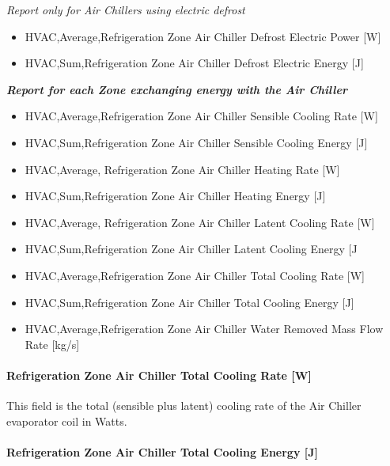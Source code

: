 \emph{Report only for Air Chillers using electric defrost}

\begin{itemize}
\item
  HVAC,Average,Refrigeration Zone Air Chiller Defrost Electric Power {[}W{]}
\item
  HVAC,Sum,Refrigeration Zone Air Chiller Defrost Electric Energy {[}J{]}
\end{itemize}

\textbf{\emph{Report for each Zone exchanging energy with the Air Chiller}}

\begin{itemize}
\item
  HVAC,Average,Refrigeration Zone Air Chiller Sensible Cooling Rate {[}W{]}
\item
  HVAC,Sum,Refrigeration Zone Air Chiller Sensible Cooling Energy {[}J{]}
\item
  HVAC,Average, Refrigeration Zone Air Chiller Heating Rate {[}W{]}
\item
  HVAC,Sum,Refrigeration Zone Air Chiller Heating Energy {[}J{]}
\item
  HVAC,Average, Refrigeration Zone Air Chiller Latent Cooling Rate {[}W{]}
\item
  HVAC,Sum,Refrigeration Zone Air Chiller Latent Cooling Energy {[}J
\item
  HVAC,Average,Refrigeration Zone Air Chiller Total Cooling Rate {[}W{]}
\item
  HVAC,Sum,Refrigeration Zone Air Chiller Total Cooling Energy {[}J{]}
\item
  HVAC,Average,Refrigeration Zone Air Chiller Water Removed Mass Flow Rate {[}kg/s{]}
\end{itemize}

\paragraph{Refrigeration Zone Air Chiller Total Cooling Rate {[}W{]}}\label{refrigeration-zone-air-chiller-total-cooling-rate-w-1}

This field is the total (sensible plus latent) cooling rate of the Air Chiller evaporator coil in Watts.

\paragraph{Refrigeration Zone Air Chiller Total Cooling Energy {[}J{]}}\label{refrigeration-zone-air-chiller-total-cooling-energy-j}

